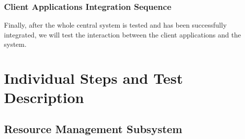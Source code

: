 \documentclass[english]{article}
\begin{document}
\begin{figure}[H]
	\centering
\end{figure}


\subsubsection{Client Applications Integration Sequence}
Finally, after the whole central system is tested and has been successfully integrated, we will test the interaction between the client applications and the system.

\begin{figure}[H]
	\centering
\end{figure}



\section{Individual Steps and Test Description}

\subsection{Resource Management Subsystem}
\end{document}
